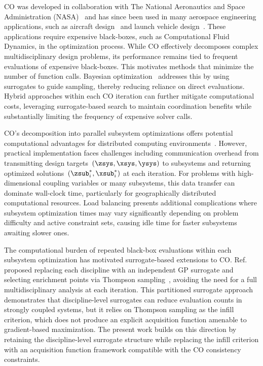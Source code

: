 CO was developed in collaboration with The National Aeronautics and Space Administration (NASA)~\cite{braun1995} and has since been used in many aerospace engineering applications, such as aircraft design~\cite{sobieski1996} and launch vehicle design~\cite{braun1996}. These applications require expensive black-boxes, such as Computational Fluid Dynamics, in the optimization process. While CO effectively decomposes complex multidisciplinary design problems, its performance remains tied to frequent evaluations of expensive black-boxes. This motivates methods that minimize the number of function calls. Bayesian optimization~\cite{frazier2018} addresses this by using surrogates to guide sampling, thereby reducing reliance on direct evaluations. Hybrid approaches within each CO iteration can further mitigate computational costs, leveraging surrogate-based search to maintain coordination benefits while substantially limiting the frequency of expensive solver calls.

CO's decomposition into parallel subsystem optimizations offers potential computational advantages for distributed computing environments~\cite{braun1995,martins2013}. However, practical implementation faces challenges including communication overhead from transmitting design targets~\((\zsys, \xsys, \ysys)\) to subsystems and returning optimized solutions~\((\zsub_i^*, \xsub_i^*)\) at each iteration. For problems with high-dimensional coupling variables or many subsystems, this data transfer can dominate wall-clock time, particularly for geographically distributed computational resources. Load balancing presents additional complications where subsystem optimization times may vary significantly depending on problem difficulty and active constraint sets, causing idle time for faster subsystems awaiting slower ones.

The computational burden of repeated black-box evaluations within each subsystem optimization has motivated surrogate-based extensions to CO. Ref.~\cite{baars2024} proposed replacing each discipline with an independent GP surrogate and selecting enrichment points via Thompson sampling~\cite{baars2024}, avoiding the need for a full multidisciplinary analysis at each iteration. This partitioned surrogate approach demonstrates that discipline-level surrogates can reduce evaluation counts in strongly coupled systems, but it relies on Thompson sampling as the infill criterion, which does not produce an explicit acquisition function amenable to gradient-based maximization. The present work builds on this direction by retaining the discipline-level surrogate structure while replacing the infill criterion with an acquisition function framework compatible with the CO consistency constraints.

